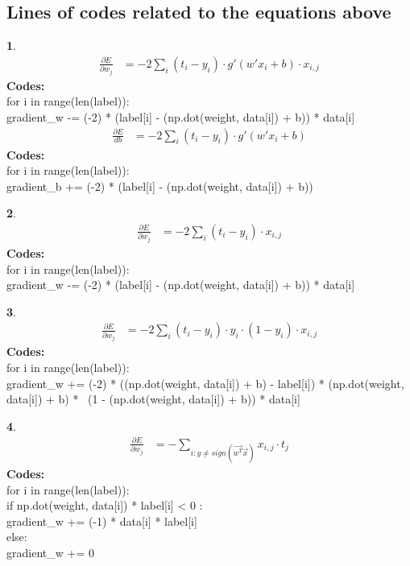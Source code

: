 \documentclass{article}
\begin{document}
\subsection{Lines of codes related to the equations above}

\vspace{10pt}
\textbf1.\\
\[\begin{aligned}
\frac{\partial E}{\partial w_j} &= -2\sum_i(t_i-y_i)\cdot g'(w'x_i+b)\cdot x_{i, j}
\end{aligned}\]
\textbf{Codes: }
\\for i in range(len(label)):
\\gradient\_w -= (-2) * (label[i] - (np.dot(weight, data[i]) + b)) * data[i]
\[\begin{aligned}
\frac{\partial E}{db} &= -2\sum_i(t_i-y_i) \cdot g'(w'x_i+b) 
\end{aligned}\]
\textbf{Codes: }
\\for i in range(len(label)):
\\gradient\_b += (-2) * (label[i] - (np.dot(weight, data[i]) + b))

\vspace{10pt}
\textbf2.\\
\[\begin{aligned}
\frac{\partial E}{\partial w_j}&= -2\sum_i(t_i-y_i)\cdot x_{i, j}
\end{aligned}
\]
\textbf{Codes: }
\\for i in range(len(label)):
\\gradient\_w -= (-2) * (label[i] - (np.dot(weight, data[i]) + b)) * data[i]

\vspace{10pt}
\textbf3.\\
\[\begin{aligned}
\frac{\partial E}{\partial w_j}&= -2\sum_i(t_i-y_i)\cdot y_i\cdot (1-y_i) \cdot x_{i, j}
\end{aligned}
\]
\textbf{Codes: }
\\for i in range(len(label)):
\\gradient\_w += (-2) * ((np.dot(weight, data[i]) + b) - label[i]) * (np.dot(weight, data[i]) + b) * \
                   (1 - (np.dot(weight, data[i]) + b)) * data[i]

\vspace{10pt}
\textbf4.\\
\[\begin{aligned}
\frac{\partial E}{\partial w_j} &= -\sum_{i:y\neq sign(\vec{w^T}\vec{x})}x_{i, j}\cdot t_j
\end{aligned}
\]
\textbf{Codes: }
\\for i in range(len(label)):
\\if np.dot(weight, data[i]) * label[i] < 0 :
\\gradient\_w += (-1) * data[i] * label[i]
\\else:
\\gradient\_w += 0
\end{document}
